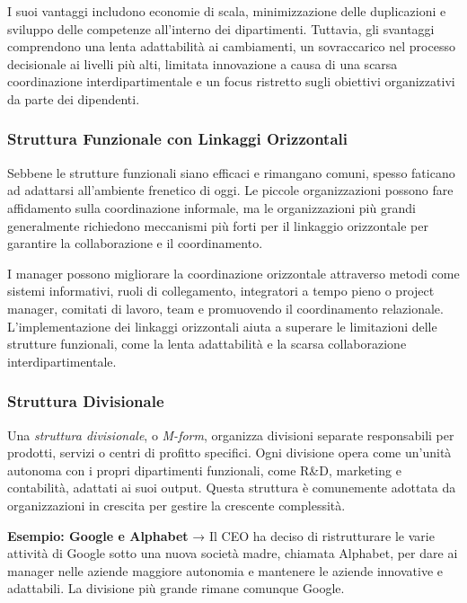 \documentclass{article}
\begin{document}
I suoi vantaggi includono economie di scala, minimizzazione delle duplicazioni e sviluppo delle competenze all'interno dei dipartimenti. Tuttavia, gli svantaggi comprendono una lenta adattabilità ai cambiamenti, un sovraccarico nel processo decisionale ai livelli più alti, limitata innovazione a causa di una scarsa coordinazione interdipartimentale e un focus ristretto sugli obiettivi organizzativi da parte dei dipendenti.

\subsubsection{Struttura Funzionale con Linkaggi Orizzontali}

Sebbene le strutture funzionali siano efficaci e rimangano comuni, spesso faticano ad adattarsi all'ambiente frenetico di oggi. Le piccole organizzazioni possono fare affidamento sulla coordinazione informale, ma le organizzazioni più grandi generalmente richiedono meccanismi più forti per il linkaggio orizzontale per garantire la collaborazione e il coordinamento.

I manager possono migliorare la coordinazione orizzontale attraverso metodi come sistemi informativi, ruoli di collegamento, integratori a tempo pieno o project manager, comitati di lavoro, team e promuovendo il coordinamento relazionale. L'implementazione dei linkaggi orizzontali aiuta a superare le limitazioni delle strutture funzionali, come la lenta adattabilità e la scarsa collaborazione interdipartimentale.

\subsubsection{Struttura Divisionale}

Una \textit{struttura divisionale}, o \textit{M-form}, organizza divisioni separate responsabili per prodotti, servizi o centri di profitto specifici. Ogni divisione opera come un'unità autonoma con i propri dipartimenti funzionali, come R\&D, marketing e contabilità, adattati ai suoi output. Questa struttura è comunemente adottata da organizzazioni in crescita per gestire la crescente complessità.

\textbf{Esempio: Google e Alphabet} → Il CEO ha deciso di ristrutturare le varie attività di Google sotto una nuova società madre, chiamata Alphabet, per dare ai manager nelle aziende maggiore autonomia e mantenere le aziende innovative e adattabili. La divisione più grande rimane comunque Google.
\end{document}
